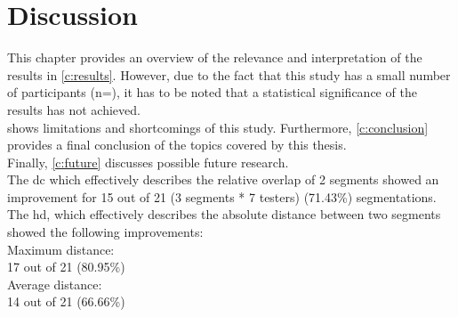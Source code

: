 
\chapter{Discussion}\label{c:discussion}
This chapter provides an overview of the relevance and interpretation of the results in \cref{c:results}.
However, due to the fact that this study has a small number of participants (n=\numberofTesters),
it has to be noted that a statistical significance of the results has not achieved.\\
 shows limitations and shortcomings of this study.
Furthermore, \cref{c:conclusion} provides a final conclusion of the topics covered by this thesis.\\
Finally, \cref{c:future} discusses possible future research.\\

\noindent
The \acrfull{dc} which effectively describes the relative overlap of 2 segments showed an improvement for 15 out of 21 (3 segments * 7 testers) (71.43\%) segmentations.\\ %
The \acrfull{hd}, which effectively describes the absolute distance between two segments showed the following improvements:\\
Maximum distance:\\
17 out of 21 (80.95\%)\\
Average distance:\\
14 out of 21 (66.66\%)

